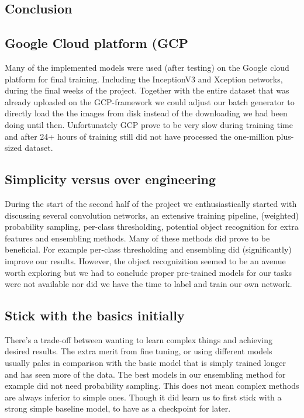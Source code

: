 \documentclass[10pt, a4paper]{article}
\begin{document}
\begin{multicols}{2}
		\section{Conclusion}
		\subsection{Google Cloud platform (GCP}
		Many of the implemented models were used (after testing) on the Google cloud platform for final training. Including the InceptionV3 and Xception networks, during the final weeks of the project. Together with the  entire dataset that was already uploaded on the GCP-framework we could adjust our batch generator to directly load the the images from disk instead of the downloading we had been doing until then. Unfortunately GCP prove to be very slow during training time and after 24+ hours of training still did not have processed the one-million plus-sized dataset.
		
		\subsection{Simplicity versus over engineering}
		During the start of the second half of the project we enthusiastically started with discussing several convolution networks, an extensive training pipeline, (weighted) probability sampling, per-class thresholding, potential object recognition for extra features and ensembling methods. Many of these methods did prove to be beneficial. For example per-class thresholding and ensembling did (significantly) improve our results. However, the object recognizition seemed to be an avenue worth exploring but we had to conclude proper pre-trained models for our tasks were not available nor did we have the time to label and train our own network. 
		
		\subsection{Stick with the basics initially}
        There's a trade-off between wanting to learn complex things and achieving desired results. The extra merit from fine tuning, or using different models usually pales in comparison with the basic model that is simply trained longer and has seen more of the data. The best models in our ensembling method for example did not need probability sampling. This does not mean complex methods are always inferior to simple ones. Though it did learn us to first stick with a strong simple baseline model, to have as a checkpoint for later. 
        

\end{multicols}
\end{document}
